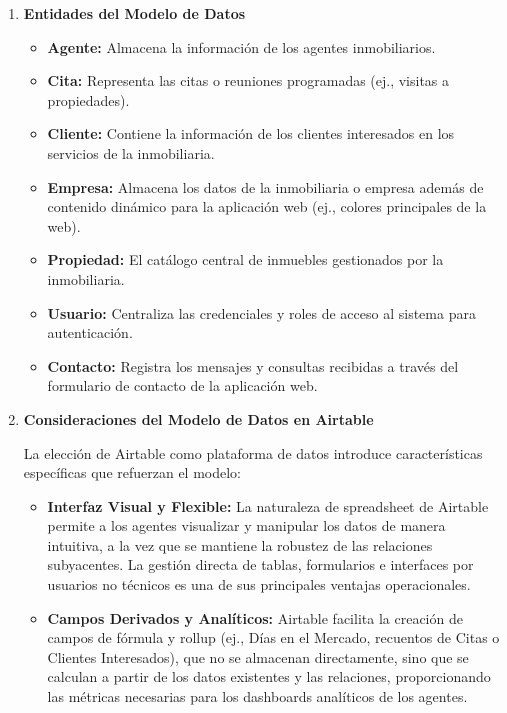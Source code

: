 \begin{enumerate}

    \item \textbf{Entidades del Modelo de Datos}

    \begin{itemize}
        \item \textbf{Agente:} Almacena la información de los agentes inmobiliarios.
    
        \item \textbf{Cita:} Representa las citas o reuniones programadas (ej., visitas a propiedades).
    
        \item \textbf{Cliente:} Contiene la información de los clientes interesados en los servicios de la inmobiliaria.
    
        \item \textbf{Empresa:} Almacena los datos de la inmobiliaria o empresa además de contenido dinámico para la aplicación web (ej., colores principales de la web).
    
        \item \textbf{Propiedad:} El catálogo central de inmuebles gestionados por la inmobiliaria.
    
        \item \textbf{Usuario:} Centraliza las credenciales y roles de acceso al sistema para autenticación.
    
        \item \textbf{Contacto:} Registra los mensajes y consultas recibidas a través del formulario de contacto de la aplicación web.
    \end{itemize}

    \item \textbf{Consideraciones del Modelo de Datos en Airtable}

    La elección de Airtable como plataforma de datos introduce características específicas que refuerzan el modelo:

    \begin{itemize}
        \item \textbf{Interfaz Visual y Flexible:} La naturaleza de spreadsheet de Airtable permite a los agentes visualizar y manipular los datos de manera intuitiva, a la vez que se mantiene la robustez de las relaciones subyacentes. La gestión directa de tablas, formularios e interfaces por usuarios no técnicos es una de sus principales ventajas operacionales.

        \item \textbf{Campos Derivados y Analíticos:} Airtable facilita la creación de campos de fórmula y rollup (ej., Días en el Mercado, recuentos de Citas o Clientes Interesados), que no se almacenan directamente, sino que se calculan a partir de los datos existentes y las relaciones, proporcionando las métricas necesarias para los dashboards analíticos de los agentes.


\end{itemize}
\end{enumerate}
